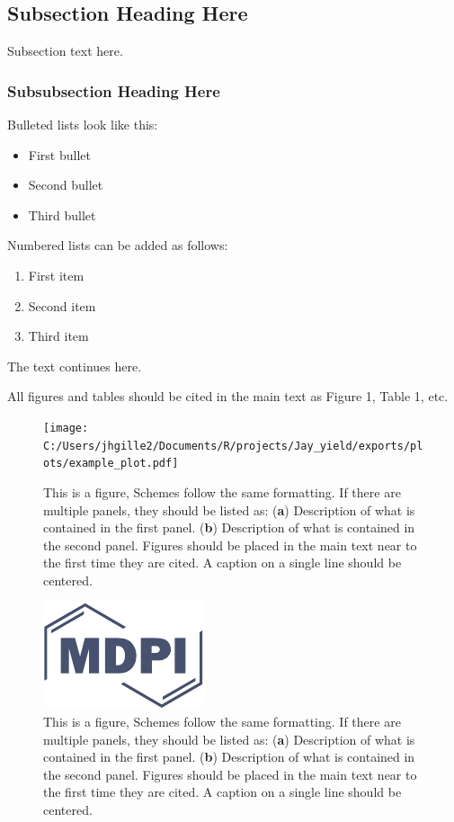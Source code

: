 \documentclass[Agronomy,article,submit,moreauthors,pdftex]{mdpi}
\providecommand{\tightlist}{%
  \setlength{\itemsep}{0pt}\setlength{\parskip}{0pt}}
\begin{document}
\hypertarget{subsection-heading-here}{%
\subsection{Subsection Heading Here}\label{subsection-heading-here}}

Subsection text here.

\hypertarget{subsubsection-heading-here}{%
\subsubsection{Subsubsection Heading
Here}\label{subsubsection-heading-here}}

Bulleted lists look like this:

\begin{itemize}
\tightlist
\item
  First bullet
\item
  Second bullet
\item
  Third bullet
\end{itemize}

Numbered lists can be added as follows:

\begin{enumerate}
\def\labelenumi{\arabic{enumi}.}
\tightlist
\item
  First item
\item
  Second item
\item
  Third item
\end{enumerate}

The text continues here.

All figures and tables should be cited in the main text as Figure 1,
Table 1, etc.

\begin{figure}[H]
\centering
\texttt{[image: C:/Users/jhgille2/Documents/R/projects/Jay\_yield/exports/plots/example\_plot.pdf]}
\caption{This is a figure, Schemes follow the same formatting. If there are multiple panels, they should be listed as: (\textbf{a}) Description of what is contained in the first panel. (\textbf{b}) Description of what is contained in the second panel. Figures should be placed in the main text near to the first time they are cited. A caption on a single line should be centered.}
\end{figure}

\begin{figure}[H]
\centering
\includegraphics[width=3 cm]{logo-mdpi}
\caption{This is a figure, Schemes follow the same formatting. If there are multiple panels, they should be listed as: (\textbf{a}) Description of what is contained in the first panel. (\textbf{b}) Description of what is contained in the second panel. Figures should be placed in the main text near to the first time they are cited. A caption on a single line should be centered.}
\end{figure}
\end{document}
